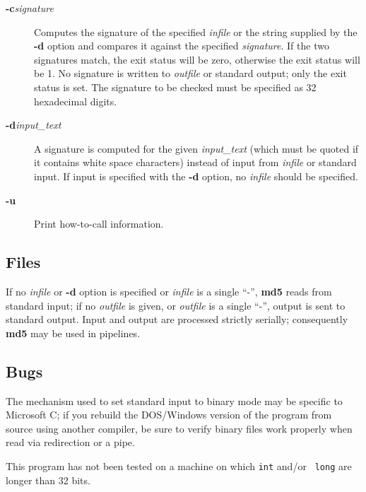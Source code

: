 \begin{description}

\item [{\bf -c}{\it signature}  ]
   Computes the signature of the specified {\it infile} or the string  supplied
by the {\bf -d} option and compares it against the specified  {\it signature}.
If the two signatures match, the exit status will be zero,  otherwise the exit
status will be 1. No signature is written to  {\it outfile} or standard
output; only the exit status is set. The  signature to be checked must be
specified as 32 hexadecimal digits.  

\item [{\bf -d}{\it input\_text}  ]
   A signature is computed for the given {\it input\_text} (which must be  quoted
if it contains white space characters) instead of input from  {\it infile} or
standard input. If input is specified with the {\bf -d}  option, no {\it
infile} should be specified.  

\item [{\bf -u}  ]
   Print how-to-call information. 
   \end{description}

\subsection{Files}

If no {\it infile} or {\bf -d} option is specified or {\it infile} is a single
``-'', {\bf md5} reads from standard input; if no {\it outfile} is given, or
{\it outfile} is a single ``-'', output is sent to standard output. Input and
output are processed strictly serially; consequently {\bf md5} may be used in
pipelines. 

\subsection{Bugs}

The mechanism used to set standard input to binary mode may be specific to
Microsoft C; if you rebuild the DOS/Windows version of the program from source
using another compiler, be sure to verify binary files work properly when read
via redirection or a pipe. 

This program has not been tested on a machine on which {\tt int} and/or {\tt
long} are longer than 32 bits. 

